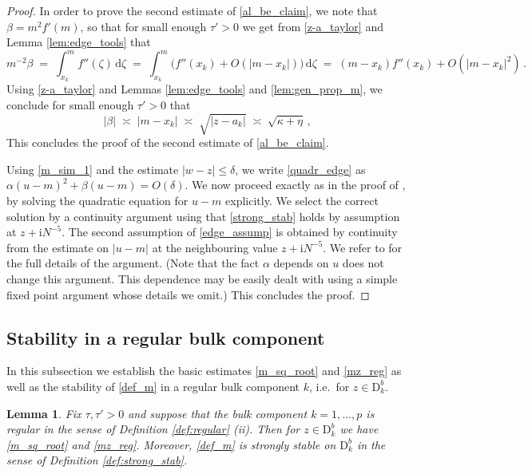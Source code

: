 \documentclass[11pt]{article} %
\numberwithin{equation}{section}
\numberwithin{figure}{section}
\theoremstyle{plain} %
\newtheorem{lemma}[theorem]{Lemma}
\theoremstyle{definition} %
\newcommand{\f}[1]{\boldsymbol{\mathrm{#1}}} %
\newcommand{\ii}{\mathrm{i}}
\newcommand{\dd}{\mathrm{d}}
\renewcommand{\leq}{\leqslant}
\newcommand{\pb}[1]{\bigl({#1}\bigr)}
\newcommand{\abs}[1]{\lvert #1 \rvert}
\begin{document}
\begin{proof}
In order to prove the second estimate of \eqref{al_be_claim}, we note that $\beta = m^2 f'(m)$, so that for small enough $\tau' > 0$ we get from \eqref{z-a_taylor} and Lemma \ref{lem:edge_tools} that
\begin{equation*}
m^{-2} \beta \;=\; \int_{x_k}^m f''(\zeta) \, \dd \zeta \;=\; \int_{x_k}^m \pb{f''(x_k) + O(\abs{m - x_k})} \, \dd \zeta \;=\; (m - x_k) f''(x_k) + O(\abs{m - x_k}^2)\,.
\end{equation*}
Using \eqref{z-a_taylor} and Lemmas \ref{lem:edge_tools} and \eqref{lem:gen_prop_m}, we conclude for small enough $\tau' > 0$ that
\begin{equation*}
\abs{\beta} \;\asymp\; \abs{m - x_k} \;\asymp\; \sqrt{\abs{z - a_k}} \;\asymp\; \sqrt{\kappa + \eta}\,,
\end{equation*}
This concludes the proof of the second estimate of \eqref{al_be_claim}.

Using \eqref{m_sim_1} and the estimate $\abs{w - z} \leq \delta$, we write \eqref{quadr_edge} as $\alpha (u - m)^2 + \beta (u - m) = O(\delta)$. We now proceed exactly as in the proof of \cite[Lemma 4.5]{BEKYY}, by solving the quadratic equation for $u - m$ explicitly. We select the correct solution by a continuity argument using that \eqref{strong_stab} holds by assumption at $z + \ii N^{-5}$. The second assumption of \eqref{edge_assump} is obtained by continuity from the estimate on $\abs{u - m}$ at the neighbouring value $z + \ii N^{-5}$. We refer to \cite[Lemma 4.5]{BEKYY} for the full details of the argument. (Note that the fact $\alpha$ depends on $u$ does not change this argument. This dependence may be easily dealt with using a simple fixed point argument whose details we omit.) This concludes the proof.
\end{proof}

\subsection{Stability in a regular bulk component}

In this subsection we establish the basic estimates \eqref{m_sq_root} and \eqref{mz_reg} as well as the stability of \eqref{def_m} in a regular bulk component $k$, i.e.\ for $z \in \f D^b_k$.

\begin{lemma} \label{lem:stab_bulk}
Fix $\tau, \tau' > 0$ and suppose that the bulk component $k = 1, \dots, p$ is regular in the sense of Definition \ref{def:regular} (ii). Then for $z \in \f D^b_k$ we have \eqref{m_sq_root} and \eqref{mz_reg}. Moreover, \eqref{def_m} is strongly stable on $\f D^b_k$ in the sense of Definition \ref{def:strong_stab}.
\end{lemma}
\end{document}
